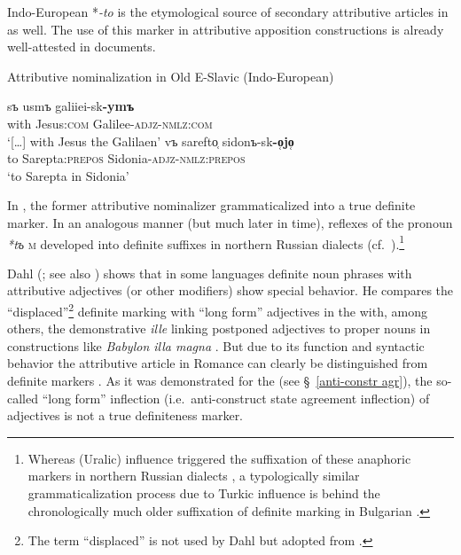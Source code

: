 {
Indo-European *\textit{-to} is the etymological source of secondary attributive articles in  as well. The use of this marker in attributive apposition constructions is already well-attested in  documents.
\begin{exe}
\ex \rm{Attributive nominalization in Old E-Slavic (Indo-European)}
\begin{xlist}
\ex
\gll	[\dots] sъ usmъ galiiei-sk\textbf{-ymъ}\\
	{ } with Jesus:\textsc{com} Galilee-\textsc{adjz}-\textsc{nmlz:com}\\
\glt 	‘[\dots] with Jesus the Galilaen’ \citep[Matthew 26, cit.][214]{mendoza2004}
\ex 
\gll	vъ sarefto̜ sidonъ-sk\textbf{-o̜jo̜}\\
	to Sarepta:\textsc{prepos} Sidonia-\textsc{adjz}-\textsc{nmlz:prepos}\\
\glt 	‘to Sarepta in Sidonia’ \citep[Luke 4, cit.][214]{mendoza2004}
\end{xlist}
\end{exe}
In , the former attributive nominalizer grammaticalized into a true definite marker. In an analogous manner (but much later in time), reflexes of the  pronoun \textit{*tъ} \textsc{m} developed into definite suffixes in northern Russian dialects (cf.~\citealt
{leinonen2006a}).\footnote{Whereas  (Uralic) influence triggered the suffixation of these anaphoric markers in northern Russian dialects \citep
{leinonen2006a}, a typologically similar grammaticalization process due to Turkic influence is behind the chronologically much older suffixation of definite marking in Bulgarian \citep[114–122]{kusmenko2008}.}

Dahl (\citeyear[149–152]{dahl2003}; see also \citealt[122–123]{dahl2015a}) shows that in some languages definite noun phrases with attributive adjectives (or other modifiers) show special behavior. He compares the “displaced”\footnote{The term “displaced” is not used by Dahl but adopted from \citet[114–116]{melcuk2006}.} definite marking with “long form” adjectives in the  with, among others, the demonstrative \textit{ille} linking postponed adjectives to proper nouns in  constructions like \textit{Babylon illa magna} \cite[150]{dahl2003}. But due to its function and syntactic behavior the attributive article in Romance can clearly be distinguished from definite markers \citep[329]{gamillscheg1937}. As it was demonstrated for the  (see \S~\ref{anti-constr agr}), the so-called “long form” inflection (i.e.~anti\hyp{}construct state agreement inflection) of adjectives is not a true definiteness marker.

}
